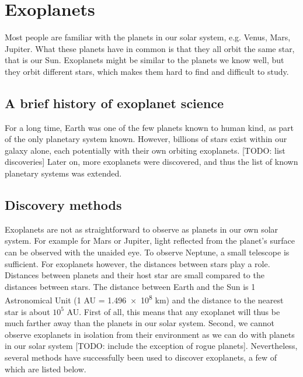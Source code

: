 
\section{Exoplanets}

Most people are familiar with the planets in our solar system, e.g. Venus, Mars, Jupiter. What these planets have in common is that they all orbit the same star, that is our Sun. Exoplanets might be similar to the planets we know well, but they orbit different stars, which makes them hard to find and difficult to study.

\subsection{A brief history of exoplanet science}
For a long time, Earth was one of the few planets known to human kind, as part of the only planetary system known. However, billions of stars exist within our galaxy alone, each potentially with their own orbiting exoplanets. [TODO: list discoveries] Later on, more exoplanets were discovered, and thus the list of known planetary systems was extended. 


\subsection{Discovery methods}
Exoplanets are not as straightforward to observe as planets in our own solar system. For example for Mars or Jupiter, light reflected from the planet's surface can be observed with the unaided eye. To observe Neptune, a small telescope is sufficient. For exoplanets however, the distances between stars play a role. Distances between planets and their host star are small compared to the distances between stars. The distance between Earth and the Sun is 1 Astronomical Unit (1 AU = \num{1.496e8} km) and the distance to the nearest star is about $10^5$ AU. First of all, this means that any exoplanet will thus be much farther away than the planets in our solar system. Second, we cannot observe exoplanets in isolation from their environment as we can do with planets in our solar system [TODO: include the exception of rogue planets]. Nevertheless, several methods have successfully been used to discover exoplanets, a few of which are listed below.

